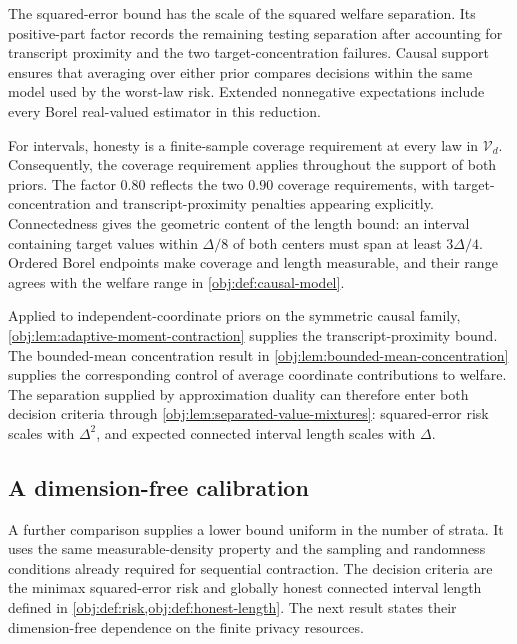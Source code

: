 The squared-error bound has the scale of the squared welfare separation. Its positive-part factor records the remaining testing separation after accounting for transcript proximity and the two target-concentration failures. Causal support ensures that averaging over either prior compares decisions within the same model used by the worst-law risk. Extended nonnegative expectations include every Borel real-valued estimator in this reduction.

For intervals, honesty is a finite-sample coverage requirement at every law in \(\mathcal V_d\). Consequently, the coverage requirement applies throughout the support of both priors. The factor \(0.80\) reflects the two \(0.90\) coverage requirements, with target-concentration and transcript-proximity penalties appearing explicitly. Connectedness gives the geometric content of the length bound: an interval containing target values within \(\Delta/8\) of both centers must span at least \(3\Delta/4\). Ordered Borel endpoints make coverage and length measurable, and their range agrees with the welfare range in \cref{obj:def:causal-model}.

Applied to independent-coordinate priors on the symmetric causal family, \cref{obj:lem:adaptive-moment-contraction} supplies the transcript-proximity bound. The bounded-mean concentration result in \cref{obj:lem:bounded-mean-concentration} supplies the corresponding control of average coordinate contributions to welfare. The separation supplied by approximation duality can therefore enter both decision criteria through \cref{obj:lem:separated-value-mixtures}: squared-error risk scales with \(\Delta^2\), and expected connected interval length scales with \(\Delta\).

\subsection{A dimension-free calibration}

A further comparison supplies a lower bound uniform in the number of strata. It uses the same measurable-density property and the sampling and randomness conditions already required for sequential contraction. The decision criteria are the minimax squared-error risk and globally honest connected interval length defined in \cref{obj:def:risk,obj:def:honest-length}. The next result states their dimension-free dependence on the finite privacy resources.

